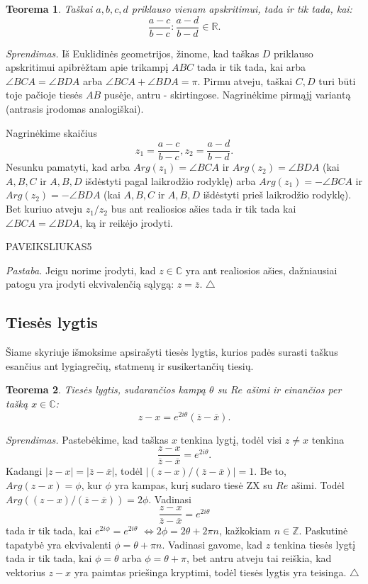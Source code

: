 \documentclass[11pt,a4paper,twoside]{book}
\newenvironment{sprendimas}{\noindent \textit{Sprendimas.}}{\hfill $\triangle$}
\newtheorem{thmnr}{Teorema}
\theoremstyle{definition} \newtheorem*{api}{Apibrėžimas}
\theoremstyle{remark} \newtheorem*{pastaba}{Pastaba}
\begin{document}
\begin{thmnr}
Taškai $a, b, c, d$ priklauso vienam apskritimui, tada ir tik tada, kai: 
$$\frac{a - c}{b - c}:\frac{a-d}{b-d}\in\mathbb{R}.$$
\end{thmnr}
\begin{sprendimas}
Iš Euklidinės geometrijos, žinome, kad taškas $D$ priklauso apskritimui apibrėžtam apie trikampį $ABC$ tada ir tik tada, kai arba $\angle BCA=\angle BDA$ arba $\angle BCA+\angle BDA=\pi $. Pirmu atveju, taškai $C, D$ turi būti toje pačioje tiesės $AB$ pusėje, antru - skirtingose. Nagrinėkime pirmąjį variantą (antrasis įrodomas analogiškai). 

Nagrinėkime skaičius $$z_1 =\frac{a - c}{b - c}, z_2 =\frac{a - d}{b - d}.$$ 
Nesunku pamatyti, kad arba $Arg (z_1) = \angle BCA$ ir $Arg (z_2) = \angle BDA$ (kai $A, B, C$ ir $A, B, D$ išdėstyti pagal laikrodžio rodyklę) arba $Arg (z_1) = -\angle BCA$ ir $Arg (z_2) =- \angle BDA$  (kai $A, B, C$ ir $A, B, D$ išdėstyti prieš laikrodžio rodyklę). Bet kuriuo atveju $z_1/z_2$ bus ant realiosios ašies tada ir tik tada kai $\angle BCA=\angle BDA$, ką ir reikėjo įrodyti.

PAVEIKSLIUKAS5

\textit {Pastaba.} Jeigu norime įrodyti, kad $z \in \mathbb{C}$ yra ant realiosios ašies, dažniausiai patogu yra įrodyti ekvivalenčią sąlygą: $z=\overline{z}$.
\end{sprendimas}






\subsection*{Tiesės lygtis}

Šiame skyriuje išmoksime apsirašyti tiesės lygtis, kurios padės surasti taškus esančius ant lygiagrečių, statmenų ir susikertančių tiesių.

\begin{thmnr}
Tiesės lygtis, sudarančios kampą $\theta$ su $Re$ ašimi ir einančios per tašką $x \in \mathbb{C}$: $$z-x=e^{2i\theta}(\overline{z}-\overline{x}).$$
\end{thmnr}
\begin{sprendimas}
Pastebėkime, kad taškas $x$ tenkina lygtį, todėl visi $ z \neq x$ tenkina $$\frac{z-x}{\overline{z}-\overline{x}}=e^{2i\theta}.$$ Kadangi $|z-x|=|\overline{z}-\overline{x}|$, todėl $|(z-x)/(\overline{z}-\overline{x})|=1$. Be to, $Arg (z-x) =\phi$, kur $\phi$ yra kampas, kurį sudaro tiesė ZX su $Re$ ašimi. Todėl $Arg ((z-x)/(\overline{z}-\overline{x})) =2\phi$. Vadinasi 
$$\frac{z-x}{\overline{z}-\overline{x}}=e^{2i\theta}$$ tada ir tik tada, kai $e^{2i\phi}=e^{2i\theta}$ $\Leftrightarrow 2\phi =2\theta + 2\pi n$, kažkokiam $n \in \mathbb{Z}.$ Paskutinė tapatybė yra ekvivalenti $\phi = \theta + \pi n$. Vadinasi gavome, kad $z$ tenkina tiesės lygtį tada ir tik tada, kai $\phi = \theta$ arba $\phi = \theta + \pi$, bet antru atveju tai reiškia, kad vektorius $z-x$ yra paimtas priešinga kryptimi, todėl tiesės lygtis yra teisinga.
\end{sprendimas}
\end{document}
